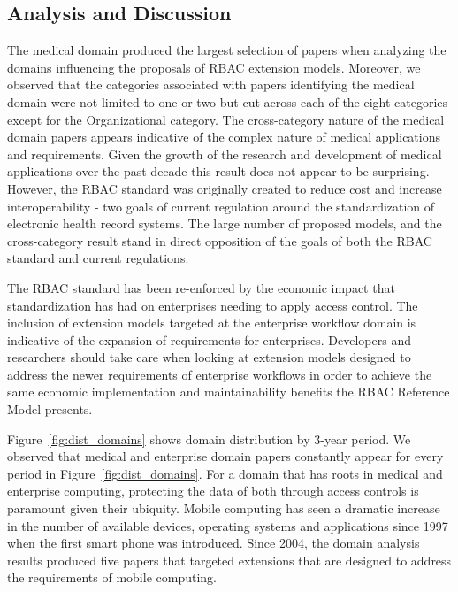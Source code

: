 \subsection{Analysis and Discussion}

The medical domain produced the largest selection of papers when analyzing the domains influencing the proposals of RBAC extension models.  
Moreover, we observed that the categories associated with papers identifying the medical domain were not limited to one or two but cut across
each of the eight categories except for the Organizational category. 
The cross-category nature of the medical domain papers appears indicative of the complex nature of medical applications and requirements.
Given the growth of the research and development of medical applications over the past decade this result does not appear to be surprising. However,
the RBAC standard was originally created to reduce cost and increase interoperability - two goals of current regulation around the standardization
of electronic health record systems. The large number of proposed models, and the cross-category result stand in direct opposition of the goals
of both the RBAC standard and current regulations.

The RBAC standard has been re-enforced by the economic impact that standardization has had on enterprises needing to apply access control.  The
inclusion of extension models targeted at the enterprise workflow domain is indicative of the expansion of requirements for enterprises. Developers
and researchers should take care when looking at extension models designed to address the newer requirements of enterprise workflows in order to
achieve the same economic implementation and maintainability benefits the RBAC Reference Model presents.

Figure~\ref{fig:dist_domains} shows domain distribution by 3-year period.
We observed that medical and enterprise domain papers constantly appear for every period in Figure~\ref{fig:dist_domains}.
For a domain that has roots in medical and enterprise computing, protecting the data of both through access controls is paramount given their ubiquity. 
Mobile computing has seen a dramatic increase in the number of available devices, operating systems and applications since 1997 when the first smart phone was introduced. Since 2004, the domain analysis results produced five papers that targeted extensions that are designed to address the requirements of mobile computing. 


